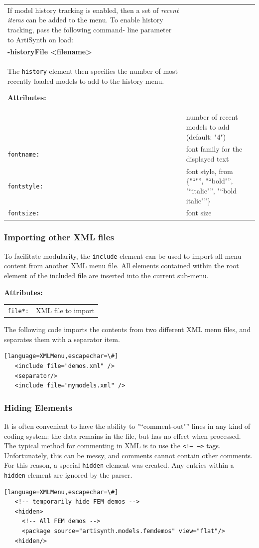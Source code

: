 \documentclass{article}
\newcommand{\openquot}{\iflatexml"\else``\fi}
\newcommand{\closequot}{\iflatexml"\else''\fi}
\newcommand{\quot}[1]{\openquot#1\closequot}
\begin{document}
\begin{tabular}{ll}
If model history tracking is enabled, then a set of \emph{recent items} can
be added to the menu.  To enable history tracking, pass the following command-%
line parameter to ArtiSynth on load:\\
\hspace{4ex}\textbf{-historyFile <filename>}\\
The {\tt history} element then specifies the number of most recently loaded
models to add to the history menu.

\noindent \textbf{Attributes:}\\
\begin{tabular}{ll}
   {\tt size:} & number of recent models to add (default: "4")\\
   {\tt fontname:} & font family for the displayed text\\
   {\tt fontstyle:} & font style, from \{\quot{}, \quot{bold}, \quot{italic},
      \quot{bold italic}\}\\
   {\tt fontsize:} & font size
\end{tabular}

\subsubsection{Importing other XML files}

To facilitate modularity, the {\tt include} element can be used to import
all menu content from another XML menu file.  All elements contained within
the root element of the included file are inserted into the current sub-menu.

\noindent \textbf{Attributes:}\\
\begin{tabular}{ll}
   {\tt file*:} & XML file to import
\end{tabular}

The following code imports the contents from two different XML menu files,
and separates them with a separator item.
\begin{lstlisting}[][language=XMLMenu,escapechar=\#]
   <include file="demos.xml" />
   <separator/>
   <include file="mymodels.xml" />
\end{lstlisting}

\subsubsection{Hiding Elements}

It is often convenient to have the ability to \quot{comment-out} lines in any
kind of coding system: the data remains in the file, but has no effect when 
processed.  The typical method for commenting in XML is to use the 
{\tt <!-- -->} tags.  Unfortunately, this can be messy, and comments cannot
contain other comments.  For this reason, a special {\tt hidden} element was
created. Any entries within a {\tt hidden} element are ignored by the parser.

\begin{lstlisting}[][language=XMLMenu,escapechar=\#]
   <!-- temporarily hide FEM demos -->
   <hidden>
     <!-- All FEM demos -->
     <package source="artisynth.models.femdemos" view="flat"/>
   <hidden/>
\end{lstlisting}
\end{document}
